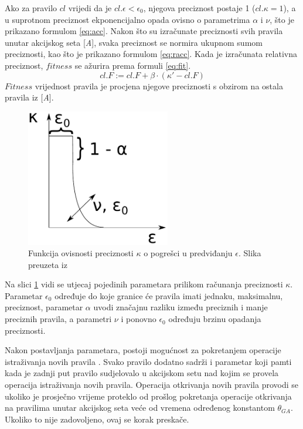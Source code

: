 \documentclass[times, utf8, zavrsni]{fer}
\begin{document}
Ako za pravilo $cl$ vrijedi da je $cl.\epsilon < \epsilon_{0}$, njegova preciznost postaje 1 ($cl.\kappa = 1$), a u suprotnom preciznost ekponencijalno opada ovisno o parametrima $\alpha$ i $\nu$, što je prikazano formulom \eqref{eq:acc}.
Nakon što su izračunate preciznosti svih pravila unutar akcijskog seta [\emph{A}], svaka preciznost se normira ukupnom sumom preciznosti, kao što je prikazano formulom \eqref{eq:racc}.
Kada je izračunata relativna preciznost, $fitness$ se ažurira prema formuli \eqref{eq:fit}.
\begin{equation}
\label{eq:fit}
cl.F := cl.F + \beta \cdot (\kappa' - cl.F)
\end{equation}
$Fitness$ vrijednost pravila je procjena njegove preciznosti s obzirom na ostala pravila iz [\emph{A}].
\begin{figure}[h]
\centering
\includegraphics[height=6cm]{img/fit.pdf}
\caption{Funkcija ovisnosti preciznosti $\kappa$ o pogrešci u predviđanju $\epsilon$. Slika preuzeta iz \citep{5}}
\label{img:fit}
\end{figure}
Na slici \ref{img:fit} vidi se utjecaj pojedinih parametara prilikom računanja preciznosti $\kappa$.
Parametar $\epsilon_{0}$ određuje do koje granice će pravila imati jednaku, maksimalnu, preciznost, parametar $\alpha$ uvodi značajnu razliku između preciznih i manje preciznih pravila, a parametri $\nu$ i ponovno $\epsilon_{0}$ određuju brzinu opadanja preciznosti.

Nakon postavljanja parametara, postoji mogućnost za pokretanjem operacije istraživanja novih pravila .
Svako pravilo dodatno sadrži i parametar koji pamti kada je zadnji put pravilo sudjelovalo u akcijskom setu nad kojim se provela operacija istraživanja novih pravila.
Operacija otkrivanja novih pravila provodi se ukoliko je prosječno vrijeme proteklo od prošlog pokretanja operacije otkrivanja na pravilima unutar akcijskog seta veće od vremena određenog konstantom $\theta_{GA}$.
Ukoliko to nije zadovoljeno, ovaj se korak preskače.
\end{document}
